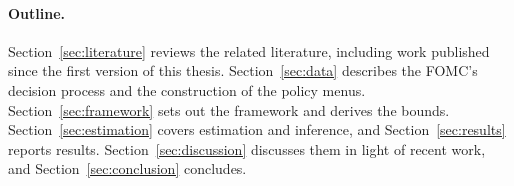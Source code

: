 \paragraph{Outline.} Section~\ref{sec:literature} reviews the related literature, including work published since
the first version of this thesis. Section~\ref{sec:data} describes the FOMC's decision process and the construction
of the policy menus. Section~\ref{sec:framework} sets out the framework and derives the bounds.
Section~\ref{sec:estimation} covers estimation and inference, and Section~\ref{sec:results} reports results.
Section~\ref{sec:discussion} discusses them in light of recent work, and Section~\ref{sec:conclusion} concludes.
